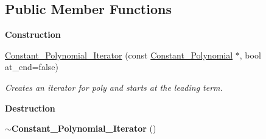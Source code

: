 \subsection*{Public Member Functions}
\begin{Indent}\textbf{ Construction}\par
\begin{DoxyCompactItemize}
\item 
\mbox{\label{class_constant___polynomial___iterator_afc5daccff7f847d0c17b880e3964b838}} 
\hyperlink{class_constant___polynomial___iterator_afc5daccff7f847d0c17b880e3964b838}{Constant\+\_\+\+Polynomial\+\_\+\+Iterator} (const \hyperlink{class_constant___polynomial}{Constant\+\_\+\+Polynomial} $\ast$, bool at\+\_\+end=false)
\begin{DoxyCompactList}\small\item\em Creates an iterator for {\ttfamily poly} and starts at the leading term. \end{DoxyCompactList}\end{DoxyCompactItemize}
\end{Indent}
\begin{Indent}\textbf{ Destruction}\par
\begin{DoxyCompactItemize}
\item 
\mbox{\label{class_constant___polynomial___iterator_a929c0ee12daaa99dc7961825507434fb}} 
{\bfseries $\sim$\+Constant\+\_\+\+Polynomial\+\_\+\+Iterator} ()
\end{DoxyCompactItemize}
\end{Indent}
